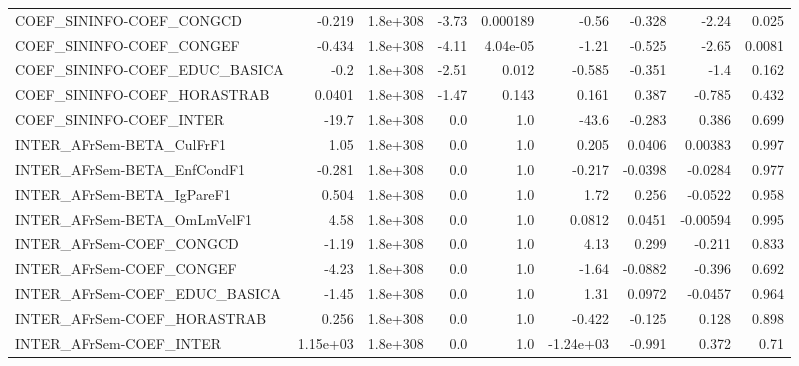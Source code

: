 \begin{tabular}{lrrrrrrrr}
COEF\_SININFO-COEF\_CONGCD              &      -0.219 &     1.8e+308 &    -3.73 & 0.000189 &      -0.56 &      -0.328 &        -2.24 &         0.025 \\
COEF\_SININFO-COEF\_CONGEF              &      -0.434 &     1.8e+308 &    -4.11 & 4.04e-05 &      -1.21 &      -0.525 &        -2.65 &        0.0081 \\
COEF\_SININFO-COEF\_EDUC\_BASICA         &        -0.2 &     1.8e+308 &    -2.51 &    0.012 &     -0.585 &      -0.351 &         -1.4 &         0.162 \\
COEF\_SININFO-COEF\_HORASTRAB           &      0.0401 &     1.8e+308 &    -1.47 &    0.143 &      0.161 &       0.387 &       -0.785 &         0.432 \\
COEF\_SININFO-COEF\_INTER               &       -19.7 &     1.8e+308 &      0.0 &      1.0 &      -43.6 &      -0.283 &        0.386 &         0.699 \\
INTER\_AFrSem-BETA\_CulFrF1             &        1.05 &     1.8e+308 &      0.0 &      1.0 &      0.205 &      0.0406 &      0.00383 &         0.997 \\
INTER\_AFrSem-BETA\_EnfCondF1           &      -0.281 &     1.8e+308 &      0.0 &      1.0 &     -0.217 &     -0.0398 &      -0.0284 &         0.977 \\
INTER\_AFrSem-BETA\_IgPareF1            &       0.504 &     1.8e+308 &      0.0 &      1.0 &       1.72 &       0.256 &      -0.0522 &         0.958 \\
INTER\_AFrSem-BETA\_OmLmVelF1           &        4.58 &     1.8e+308 &      0.0 &      1.0 &     0.0812 &      0.0451 &     -0.00594 &         0.995 \\
INTER\_AFrSem-COEF\_CONGCD              &       -1.19 &     1.8e+308 &      0.0 &      1.0 &       4.13 &       0.299 &       -0.211 &         0.833 \\
INTER\_AFrSem-COEF\_CONGEF              &       -4.23 &     1.8e+308 &      0.0 &      1.0 &      -1.64 &     -0.0882 &       -0.396 &         0.692 \\
INTER\_AFrSem-COEF\_EDUC\_BASICA         &       -1.45 &     1.8e+308 &      0.0 &      1.0 &       1.31 &      0.0972 &      -0.0457 &         0.964 \\
INTER\_AFrSem-COEF\_HORASTRAB           &       0.256 &     1.8e+308 &      0.0 &      1.0 &     -0.422 &      -0.125 &        0.128 &         0.898 \\
INTER\_AFrSem-COEF\_INTER               &    1.15e+03 &     1.8e+308 &      0.0 &      1.0 &  -1.24e+03 &      -0.991 &        0.372 &          0.71 \\

\end{tabular}
